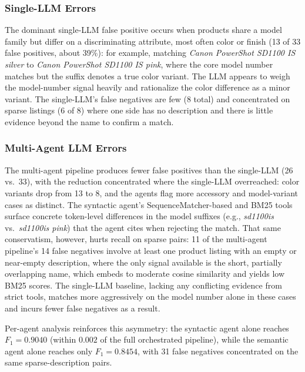 \documentclass[sigconf]{acmart}
\begin{document}
\subsubsection{Single-LLM Errors}
The dominant single-LLM false positive occurs when products share a model family but differ on a discriminating attribute, most often color or finish (13 of 33 false positives, about 39\%): for example, matching \textit{Canon PowerShot SD1100 IS silver} to \textit{Canon PowerShot SD1100 IS pink}, where the core model number matches but the suffix denotes a true color variant.
The LLM appears to weigh the model-number signal heavily and rationalize the color difference as a minor variant.
The single-LLM's false negatives are few (8 total) and concentrated on sparse listings (6 of 8) where one side has no description and there is little evidence beyond the name to confirm a match.

\subsubsection{Multi-Agent LLM Errors}
The multi-agent pipeline produces fewer false positives than the single-LLM (26 vs.\ 33), with the reduction concentrated where the single-LLM overreached: color variants drop from 13 to 8, and the agents flag more accessory and model-variant cases as distinct.
The syntactic agent's SequenceMatcher-based and BM25 tools surface concrete token-level differences in the model suffixes (e.g., \textit{sd1100is} vs.\ \textit{sd1100is pink}) that the agent cites when rejecting the match.
That same conservatism, however, hurts recall on sparse pairs: 11 of the multi-agent pipeline's 14 false negatives involve at least one product listing with an empty or near-empty description, where the only signal available is the short, partially overlapping name, which embeds to moderate cosine similarity and yields low BM25 scores.
The single-LLM baseline, lacking any conflicting evidence from strict tools, matches more aggressively on the model number alone in these cases and incurs fewer false negatives as a result.

Per-agent analysis reinforces this asymmetry: the syntactic agent alone reaches $F_1 = 0.9040$ (within $0.002$ of the full orchestrated pipeline), while the semantic agent alone reaches only $F_1 = 0.8454$, with 31 false negatives concentrated on the same sparse-description pairs.
\end{document}
